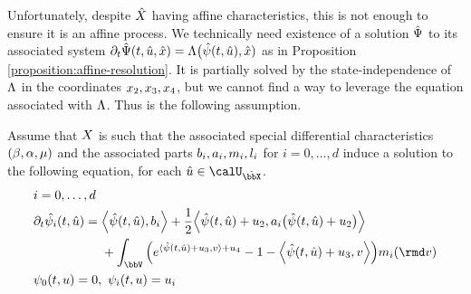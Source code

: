 Unfortunately, despite $\hat{X}$ having affine characteristics, this is not enough to ensure it is an affine process.
We technically need existence of a solution $\hat{\Psi}$ to its associated system $\partial_t\hat{\Psi}(t, \hat{u}, \hat{x}) = \Lambda\big(\hat{\psi}(t, \hat{u}), \hat{x})$ as in Proposition \ref{proposition:affine-resolution}.
It is partially solved by the state-independence of $\Lambda$ in the coordinates $x_2, x_3, x_4$, but we cannot find a way to leverage the equation associated with $\Lambda$.
Thus is the following assumption.
\begin{assumption}
  \label{assumption:joint-affine}
  Assume that $X$ is such that the associated special differential characteristics $(\beta, \alpha, \mu)$ and the associated parts $b_i, a_i, m_i, l_i$ for $i = 0, \ldots, d$ induce a solution to the following equation, for each $\hat\momentVar\in\boundedSpaceJoint$.
  \begin{equation*}
    \begin{aligned}[t]
      &i = 0, \ldots, d \\
      & \partial_t\hat{\affPart_i}(t, \hat\momentVar) = \begin{aligned}[t]
        &\Bprj{\hat\affPart(t, \hat\momentVar)}{\affDriftPart_i} +  \frac12\Bprj{\hat\affPart(t, \hat\momentVar)+\momentVar_2}{\affDiffPart_i\big(\hat\affPart(t,\hat\momentVar)+\momentVar_2\big)} \\
        &+ \int_\vecSpace \Big( e^{\prj{\hat\affPart(t,\hat\momentVar) + \momentVar_3}{\markVar} + \momentVar_4} - 1 - \Bprj{\hat\affPart(t,\hat\momentVar) + \momentVar_3}{\markVar} \Big) \affJumpPart_i(\rmd\markVar) 
      \end{aligned} \\
      & \affPart_0(t, \momentVar) = 0, ~ \affPart_i(t, \momentVar) = \momentVar_i
    \end{aligned}
  \end{equation*}
\end{assumption}
